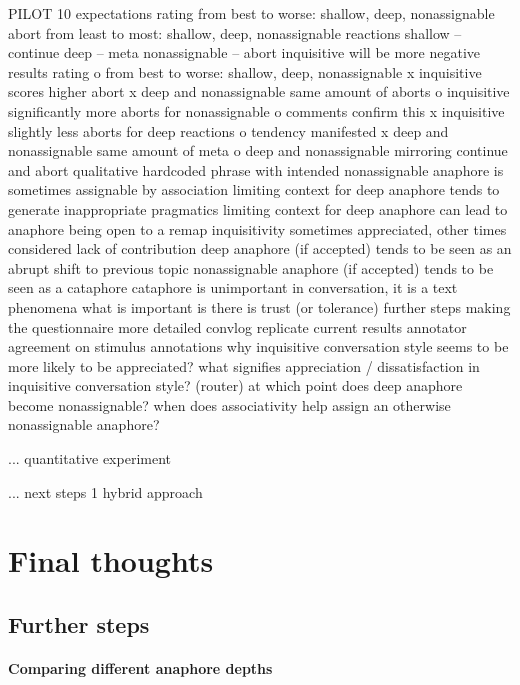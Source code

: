 \documentclass[12pt]{report}
\begin{document}
{PILOT 10
    expectations
		rating
			from best to worse: shallow, deep, nonassignable
		abort
			from least to most: shallow, deep, nonassignable
		reactions
			shallow 	– continue
			deep		– meta
			nonassignable 	– abort
		inquisitive will be more negative
	results
		rating
			o from best to worse: shallow, deep, nonassignable
			x inquisitive scores higher
		abort
			x deep and nonassignable same amount of aborts
			o inquisitive significantly more aborts for nonassignable
			o comments confirm this
			x inquisitive slightly less aborts for deep
		reactions
			o tendency manifested
			x deep and nonassignable same amount of meta
			o deep and nonassignable mirroring continue and abort
	qualitative
		hardcoded phrase with intended nonassignable anaphore is sometimes assignable by association
		limiting context for deep anaphore tends to generate inappropriate pragmatics
		limiting context for deep anaphore can lead to anaphore being open to a remap
		inquisitivity sometimes appreciated, other times considered lack of contribution
		deep anaphore (if accepted) tends to be seen as an abrupt shift to previous topic
		nonassignable anaphore (if accepted) tends to be seen as a cataphore
		        cataphore is unimportant in conversation, it is a text phenomena
			    what is important is there is trust (or tolerance)
	further steps
		making the questionnaire more detailed
			convlog
		replicate current results
		annotator agreement on stimulus annotations
		why inquisitive conversation style seems to be more likely to be appreciated?
		what signifies appreciation / dissatisfaction in inquisitive conversation style? (router)
		at which point does deep anaphore become nonassignable?
		when does associativity help assign an otherwise nonassignable anaphore?


        ... quantitative experiment

        ... next steps
        1 hybrid approach
\fi

\chapter*{Final thoughts}

\section{Further steps}

\subsubsection{Comparing different anaphore depths}
}
\end{document}
